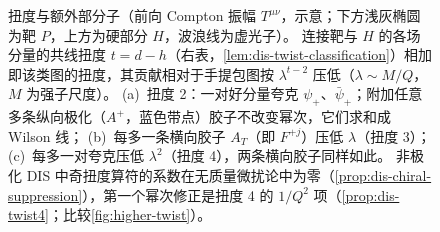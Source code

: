 \begin{figure}[htbp]
\caption{扭度与额外部分子（前向 Compton 振幅 $T^{\mu\nu}$，示意；下方浅灰椭圆为靶 $P$，上方为硬部分 $H$，波浪线为虚光子）。
连接靶与 $H$ 的各场分量的共线扭度 $t=d-h$（右表，\cref{lem:dis-twist-classification}）相加即该类图的扭度，其贡献相对于手提包图按 $\lambda^{t-2}$ 压低（$\lambda\sim M/Q$，$M$ 为强子尺度）。
(a)~扭度 2：一对好分量夸克 $\psi_+$、$\bar\psi_+$；附加任意多条纵向极化（$A^+$，蓝色带点）胶子不改变幂次，它们求和成 Wilson 线；
(b)~每多一条横向胶子 $A_T$（即 $F^{+j}$）压低 $\lambda$（扭度 3）；(c)~每多一对夸克压低 $\lambda^2$（扭度 4），两条横向胶子同样如此。
非极化 DIS 中奇扭度算符的系数在无质量微扰论中为零（\cref{prop:dis-chiral-suppression}），第一个幂次修正是扭度 4 的 $1/Q^2$ 项（\cref{prop:dis-twist4}；比较\cref{fig:higher-twist}）。}
\label{fig:dis-twist-graphical}
\end{figure}


